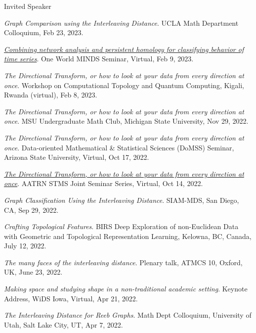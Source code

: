 \documentclass{resume} %
\begin{document}
\begin{rSection}{Invited Speaker}
\begin{etaremune}
\item\emph{Graph Comparison using the Interleaving Distance}. UCLA Math Department Colloquium, Feb 23, 2023. 

\item\emph{\href{https://youtu.be/EYOTp1I0mwY}{Combining network analysis and persistent homology for classifying behavior of time series}}. One World MINDS Seminar, Virtual, Feb 9, 2023. 

\item\emph{The Directional Transform, or how to look at your data from every direction at once}. Workshop on Computational Topology and Quantum Computing, Kigali, Rwanda (virtual), Feb 8, 2023. 

\item\emph{The Directional Transform, or how to look at your data from every direction at once}. MSU Undergraduate Math Club, Michigan State University, Nov 29, 2022. 

\item\emph{The Directional Transform, or how to look at your data from every direction at once}. Data-oriented Mathematical \& Statistical Sciences (DoMSS) Seminar, Arizona State University, Virtual, Oct 17, 2022. 

\item\emph{\href{https://www.youtube.com/watch?v=_-gDBosxp2M}{The Directional Transform, or how to look at your data from every direction at once}}. AATRN STMS Joint Seminar Series, Virtual, Oct 14, 2022. 

\item\emph{Graph Classification Using the Interleaving Distance}. SIAM-MDS, San Diego, CA, Sep 29, 2022. 

\item\emph{Crafting Topological Features}. BIRS Deep Exploration of non-Euclidean Data with Geometric and Topological Representation Learning, Kelowna, BC, Canada, July 12, 2022. 

\item\emph{The many faces of the interleaving distance}. Plenary talk, ATMCS 10, Oxford, UK, June 23, 2022. 

\item\emph{Making space and studying shape in a non-traditional academic setting}. Keynote Address, WiDS Iowa, Virtual, Apr 21, 2022. 

\item\emph{The Interleaving Distance for Reeb Graphs}. Math Dept Colloquium, University of Utah, Salt Lake City, UT, Apr 7, 2022. 


\end{etaremune}
\end{rSection}
\end{document}
